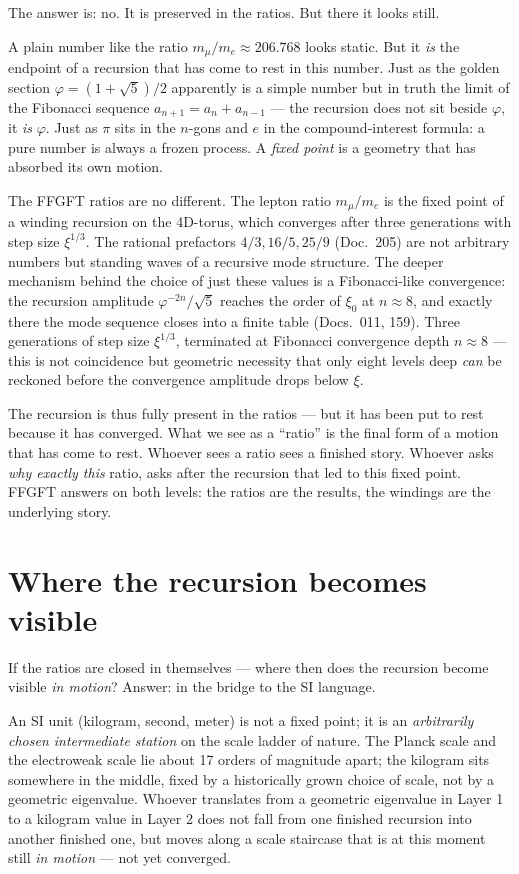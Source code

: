 The answer is: no. It is preserved in the ratios. But there it looks
still.

A plain number like the ratio $m_{\mu}/m_{e} \approx 206{.}768$ looks
static. But it \emph{is} the endpoint of a recursion that has come to
rest in this number. Just as the golden section
$\varphi = (1+\sqrt{5})/2$ apparently is a simple number but in truth
the limit of the Fibonacci sequence $a_{n+1} = a_{n} + a_{n-1}$ ---
the recursion does not sit beside $\varphi$, it \emph{is} $\varphi$.
Just as $\pi$ sits in the $n$-gons and $e$ in the compound-interest
formula: a pure number is always a frozen process. A \emph{fixed
point} is a geometry that has absorbed its own motion.

The FFGFT ratios are no different. The lepton ratio $m_{\mu}/m_{e}$ is
the fixed point of a winding recursion on the 4D-torus, which converges
after three generations with step size $\xi^{1/3}$. The rational
prefactors $4/3, 16/5, 25/9$ (Doc.~205) are not arbitrary numbers but
standing waves of a recursive mode structure. The deeper mechanism
behind the choice of just these values is a Fibonacci-like convergence:
the recursion amplitude $\varphi^{-2n}/\sqrt{5}$ reaches the order of
$\xi_{0}$ at $n \approx 8$, and exactly there the mode sequence closes
into a finite table (Docs.~011, 159). Three generations of step size
$\xi^{1/3}$, terminated at Fibonacci convergence depth $n \approx 8$
--- this is not coincidence but geometric necessity that only eight
levels deep \emph{can} be reckoned before the convergence amplitude
drops below $\xi$.

The recursion is thus fully present in the ratios --- but it has been
put to rest because it has converged. What we see as a ``ratio'' is
the final form of a motion that has come to rest. Whoever sees a ratio
sees a finished story. Whoever asks \emph{why exactly this} ratio,
asks after the recursion that led to this fixed point. FFGFT answers
on both levels: the ratios are the results, the windings are the
underlying story.

\section{Where the recursion becomes visible}

If the ratios are closed in themselves --- where then does the
recursion become visible \emph{in motion}? Answer: in the bridge to
the SI language.

An SI unit (kilogram, second, meter) is not a fixed point; it is an
\emph{arbitrarily chosen intermediate station} on the scale ladder of
nature. The Planck scale and the electroweak scale lie about 17 orders
of magnitude apart; the kilogram sits somewhere in the middle, fixed
by a historically grown choice of scale, not by a geometric eigenvalue.
Whoever translates from a geometric eigenvalue in Layer 1 to a
kilogram value in Layer 2 does not fall from one finished recursion
into another finished one, but moves along a scale staircase that is
at this moment still \emph{in motion} --- not yet converged.

